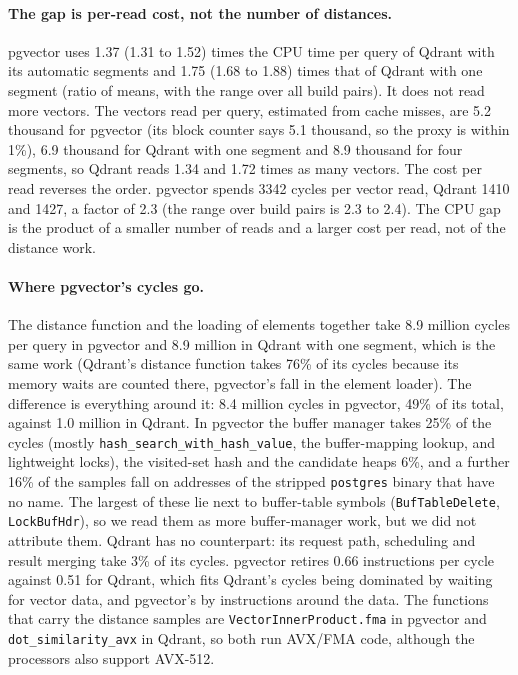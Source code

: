 \documentclass[sigconf, nonacm]{acmart}
\begin{document}
\paragraph{The gap is per-read cost, not the number of distances.}
pgvector uses 1.37 (1.31 to 1.52) times the CPU time per query of Qdrant with its automatic segments and 1.75 (1.68 to 1.88) times that of Qdrant with one
segment (ratio of means, with the range over all build pairs). It does not read more vectors. The vectors read per query,
estimated from cache misses, are 5.2 thousand for pgvector (its block counter says 5.1 thousand, so the proxy
is within 1\%), 6.9 thousand for Qdrant with one segment and 8.9 thousand for four segments, so Qdrant reads 1.34 and 1.72
times as many vectors. The cost per read reverses the order. pgvector spends 3342 cycles per vector read, Qdrant 1410
and 1427, a factor of 2.3 (the range over build pairs is 2.3 to 2.4). The CPU gap is the product of a smaller number of
reads and a larger cost per read, not of the distance work.

\paragraph{Where pgvector's cycles go.} The distance function and the loading of elements together take
8.9 million cycles per query in pgvector and 8.9 million in Qdrant with one segment, which is the same work
(Qdrant's distance function takes 76\% of its cycles because its memory waits are counted there, pgvector's
fall in the element loader). The difference is everything around it: 8.4 million cycles
in pgvector, 49\% of its total, against 1.0 million in Qdrant. In pgvector the buffer manager takes 25\% of the cycles
(mostly \texttt{hash\_search\_with\_hash\_value}, the buffer-mapping lookup, and lightweight locks), the
visited-set hash and the candidate heaps 6\%, and a further 16\% of the samples fall on addresses of the stripped
\texttt{postgres} binary that have no name. The largest of these lie next to buffer-table symbols
(\texttt{BufTableDelete}, \texttt{LockBufHdr}), so we read them as more buffer-manager work, but we did not attribute them.
Qdrant has no counterpart: its request path, scheduling and result merging take 3\% of its cycles.
pgvector retires 0.66 instructions per cycle against 0.51 for Qdrant, which fits Qdrant's cycles being dominated by waiting
for vector data, and pgvector's by instructions around the data. The functions that carry the distance samples are
\texttt{VectorInnerProduct.fma} in pgvector and \texttt{dot\_similarity\_avx} in Qdrant, so both run AVX/FMA code, although
the processors also support AVX-512.
\end{document}
